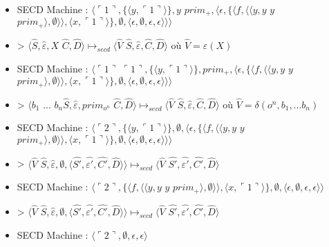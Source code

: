 \documentclass[10pt,a4paper]{article}
\begin{document}
\begin{itemize}
					\item[] SECD Machine : $\langle\ulcorner 1\urcorner,\{\langle y,\ulcorner 1\urcorner\rangle\},y$ $prim_{+},\langle\epsilon,\{\langle f,\langle\langle y,y$ $y$ $prim_{+}\rangle,\emptyset\rangle\rangle,\langle x,\ulcorner 1\urcorner\rangle\} ,\emptyset,\langle\epsilon,\emptyset,\epsilon,\epsilon\rangle\rangle\rangle$
					\item[] > $\langle\widehat{S},\widehat{\varepsilon},X$ $\widehat{C},\widehat{D}\rangle \longmapsto_{secd} \langle \widehat{V}$ $\widehat{S},\widehat{\varepsilon},\widehat{C},\widehat{D}\rangle$ où $\widehat{V} = \varepsilon(X)$
					\item[] SECD Machine : $\langle\ulcorner 1\urcorner$ $\ulcorner 1\urcorner,\{\langle y,\ulcorner 1\urcorner\rangle\},prim_{+},\langle\epsilon,\{\langle f,\langle\langle y,y$ $y$ $prim_{+}\rangle,\emptyset\rangle\rangle,\langle x,\ulcorner 1\urcorner\rangle\} ,\emptyset,\langle\epsilon,\emptyset,\epsilon,\epsilon\rangle\rangle\rangle$
					\item[] > $\langle b_{1}$ $...$ $b_{n}\widehat{S},\widehat{\varepsilon},prim_{o^{n}}$ $\widehat{C},\widehat{D}\rangle \longmapsto_{secd} \langle \widehat{V}$ $\widehat{S},\widehat{\varepsilon},\widehat{C},\widehat{D}\rangle$ où $\widehat{V} = \delta(o^{n},b_1,...b_{n})$
					\item[] SECD Machine : $\langle\ulcorner 2\urcorner,\{\langle y,\ulcorner 1\urcorner\rangle\},\emptyset,\langle\epsilon,\{\langle f,\langle\langle y,y$ $y$ $prim_{+}\rangle,\emptyset\rangle\rangle,\langle x,\ulcorner 1\urcorner\rangle\} ,\emptyset,\langle\epsilon,\emptyset,\epsilon,\epsilon\rangle\rangle\rangle$
					\item[] > $\langle\widehat{V}$ $\widehat{S},\widehat{\varepsilon},\emptyset,\langle\widehat{S'},\widehat{\varepsilon'},\widehat{C'},\widehat{D}\rangle\rangle \longmapsto_{secd} \langle \widehat{V}$ $\widehat{S'},\widehat{\varepsilon'},\widehat{C'},\widehat{D}\rangle$
					\item[] SECD Machine : $\langle\ulcorner 2\urcorner,\{\langle f,\langle\langle y,y$ $y$ $prim_{+}\rangle,\emptyset\rangle\rangle,\langle x,\ulcorner 1\urcorner\rangle\} ,\emptyset,\langle\epsilon,\emptyset,\epsilon,\epsilon\rangle\rangle$
					\item[] > $\langle\widehat{V}$ $\widehat{S},\widehat{\varepsilon},\emptyset,\langle\widehat{S'},\widehat{\varepsilon'},\widehat{C'},\widehat{D}\rangle\rangle \longmapsto_{secd} \langle \widehat{V}$ $\widehat{S'},\widehat{\varepsilon'},\widehat{C'},\widehat{D}\rangle$
					\item[] SECD Machine : $\langle\ulcorner 2\urcorner,\emptyset,\epsilon,\epsilon\rangle$
				\end{itemize}
				\newpage
		
\end{document}
